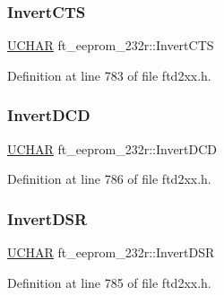 \mbox{\label{structft__eeprom__232r_a95c9b6e2547151c62c36a981e3d121e6}} 
\subsubsection{\texorpdfstring{Invert\+C\+TS}{InvertCTS}}
{\footnotesize\ttfamily \hyperlink{CatCaloProto40MHz_2inc_2WinTypes_8h_a4f4bb67531a9bf6f0b9c6ad76aeba587}{U\+C\+H\+AR} ft\+\_\+eeprom\+\_\+232r\+::\+Invert\+C\+TS}



Definition at line 783 of file ftd2xx.\+h.

\mbox{\label{structft__eeprom__232r_a5ed1bcd1082728d070876c21c167743e}} 
\subsubsection{\texorpdfstring{Invert\+D\+CD}{InvertDCD}}
{\footnotesize\ttfamily \hyperlink{CatCaloProto40MHz_2inc_2WinTypes_8h_a4f4bb67531a9bf6f0b9c6ad76aeba587}{U\+C\+H\+AR} ft\+\_\+eeprom\+\_\+232r\+::\+Invert\+D\+CD}



Definition at line 786 of file ftd2xx.\+h.

\mbox{\label{structft__eeprom__232r_af9f2706ecbe6182d52bce8d237cc9162}} 
\subsubsection{\texorpdfstring{Invert\+D\+SR}{InvertDSR}}
{\footnotesize\ttfamily \hyperlink{CatCaloProto40MHz_2inc_2WinTypes_8h_a4f4bb67531a9bf6f0b9c6ad76aeba587}{U\+C\+H\+AR} ft\+\_\+eeprom\+\_\+232r\+::\+Invert\+D\+SR}



Definition at line 785 of file ftd2xx.\+h.

